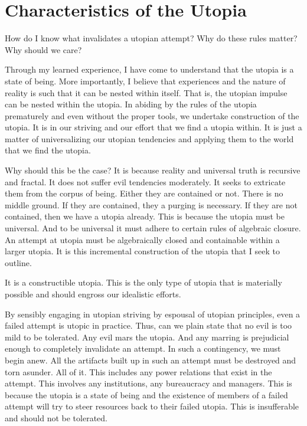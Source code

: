 \documentclass[12pt]{article}
\begin{document}
\section{Characteristics of the Utopia}
How do I know what invalidates a utopian attempt?
Why do these rules matter?
Why should we care?

Through my learned experience, I have come to understand that the utopia is a state of being.
More importantly, I believe that experiences and the nature of reality is such that it can be nested within itself.
That is, the utopian impulse can be nested within the utopia.
In abiding by the rules of the utopia prematurely and even without the proper tools, we undertake construction of the utopia.
It is in our striving and our effort that we find a utopia within.
It is just a matter of universalizing our utopian tendencies and applying them to the world that we find the utopia.

Why should this be the case?
It is because reality and universal truth is recursive and fractal.
It does not suffer evil tendencies moderately.
It seeks to extricate them from the corpus of being.
Either they are contained or not.
There is no middle ground.
If they are contained, they a purging is necessary.
If they are not contained, then we have a utopia already.
This is because the utopia must be universal.
And to be universal it must adhere to certain rules of algebraic closure.
An attempt at utopia must be algebraically closed and containable within a larger utopia.
It is this incremental construction of the utopia that I seek to outline.

It is a constructible utopia.
This is the only type of utopia that is materially possible and should engross our idealistic efforts.

By sensibly engaging in utopian striving by espousal of utopian principles, even a failed attempt is utopic in practice.
Thus, can we plain state that no evil is too mild to be tolerated.
Any evil mars the utopia.
And any marring is prejudicial enough to completely invalidate an attempt.
In such a contingency, we must begin anew.
All the artifacts built up in such an attempt must be destroyed and torn asunder.
All of it.
This includes any power relations that exist in the attempt.
This involves any institutions, any bureaucracy and managers.
This is because the utopia is a state of being and the existence of members of a failed attempt will try to steer resources back to their failed utopia.
This is insufferable and should not be tolerated.
\end{document}
